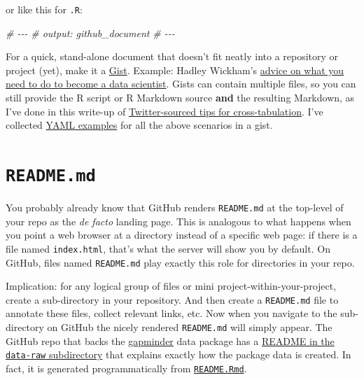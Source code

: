 \documentclass[
]{book}
\newenvironment{Shaded}{\begin{snugshade}}{\end{snugshade}}
\newcommand{\CommentTok}[1]{\textcolor[rgb]{0.56,0.35,0.01}{\textit{#1}}}
\begin{document}
or like this for \texttt{.R}:

\begin{Shaded}
\begin{Highlighting}[]
\CommentTok{\#\textquotesingle{} {-}{-}{-}}
\CommentTok{\#\textquotesingle{} output: github\_document}
\CommentTok{\#\textquotesingle{} {-}{-}{-}}
\end{Highlighting}
\end{Shaded}

For a quick, stand-alone document that doesn't fit neatly into a repository or project (yet), make it a \href{https://gist.github.com}{Gist}. Example: Hadley Wickham's \href{https://gist.github.com/hadley/820f09ded347c62c2864}{advice on what you need to do to become a data scientist}. Gists can contain multiple files, so you can still provide the R script or R Markdown source \textbf{and} the resulting Markdown, as I've done in this write-up of \href{https://gist.github.com/jennybc/04b71bfaaf0f88d9d2eb}{Twitter-sourced tips for cross-tabulation}. I've collected \href{https://gist.github.com/jennybc/402761e30b9be8023af9}{YAML examples} for all the above scenarios in a gist.

\section{\texorpdfstring{\texttt{README.md}}{README.md}}\label{readme.md}

You probably already know that GitHub renders \texttt{README.md} at the top-level of your repo as the \emph{de facto} landing page. This is analogous to what happens when you point a web browser at a directory instead of a specific web page: if there is a file named \texttt{index.html}, that's what the server will show you by default. On GitHub, files named \texttt{README.md} play exactly this role for directories in your repo.

Implication: for any logical group of files or mini project-within-your-project, create a sub-directory in your repository. And then create a \texttt{README.md} file to annotate these files, collect relevant links, etc. Now when you navigate to the sub-directory on GitHub the nicely rendered \texttt{README.md} will simply appear. The GitHub repo that backs the \href{https://cran.r-project.org/package=gapminder}{gapminder} data package has a \href{https://github.com/jennybc/gapminder/tree/master/data-raw\#readme}{README in the \texttt{data-raw} subdirectory} that explains exactly how the package data is created. In fact, it is generated programmatically from \href{https://github.com/jennybc/gapminder/blob/master/data-raw/README.Rmd}{\texttt{README.Rmd}}.
\end{document}
